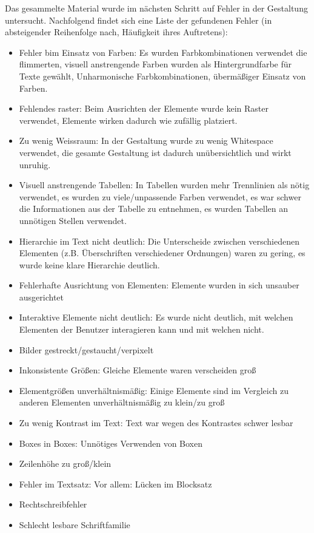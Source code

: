 Das gesammelte Material wurde im nächsten Schritt auf Fehler in der Gestaltung untersucht. Nachfolgend findet sich eine Liste der gefundenen Fehler (in absteigender Reihenfolge nach, Häufigkeit ihres Auftretens):

\begin{itemize}
	\item Fehler bim Einsatz von Farben: Es wurden Farbkombinationen verwendet die flimmerten, visuell anstrengende Farben wurden als Hintergrundfarbe für Texte gewählt, Unharmonische Farbkombinationen, übermäßiger Einsatz von Farben.
	\item Fehlendes raster: Beim Ausrichten der Elemente wurde kein Raster verwendet, Elemente wirken dadurch wie zufällig platziert.
	\item Zu wenig Weissraum: In der Gestaltung wurde zu wenig Whitespace verwendet, die gesamte Gestaltung ist dadurch unübersichtlich und wirkt unruhig.
	\item Visuell anstrengende Tabellen: In Tabellen wurden mehr Trennlinien als nötig verwendet, es wurden zu viele/unpassende Farben verwendet, es war schwer die Informationen aus der Tabelle zu entnehmen, es wurden Tabellen an unnötigen Stellen verwendet.
	\item Hierarchie im Text nicht deutlich: Die Unterscheide zwischen verschiedenen Elementen (z.B. Überschriften verschiedener Ordnungen) waren zu gering, es wurde keine klare Hierarchie deutlich.
	\item Fehlerhafte Ausrichtung von Elementen: Elemente wurden in sich unsauber ausgerichtet
	\item Interaktive Elemente nicht deutlich: Es wurde nicht deutlich, mit welchen Elementen der Benutzer interagieren kann und mit welchen nicht.
	\item Bilder gestreckt/gestaucht/verpixelt
	\item Inkonsistente Größen: Gleiche Elemente waren verscheiden groß
	\item Elementgrößen unverhältnismäßig: Einige Elemente sind im Vergleich zu anderen Elementen unverhältnismäßig zu klein/zu groß
	\item Zu wenig Kontrast im Text: Text war wegen des Kontrastes schwer lesbar
	\item Boxes in Boxes: Unnötiges Verwenden von Boxen
	\item Zeilenhöhe zu groß/klein
	\item Fehler im Textsatz: Vor allem: Lücken im Blocksatz
	\item Rechtschreibfehler
	\item Schlecht lesbare Schriftfamilie
\end{itemize}


